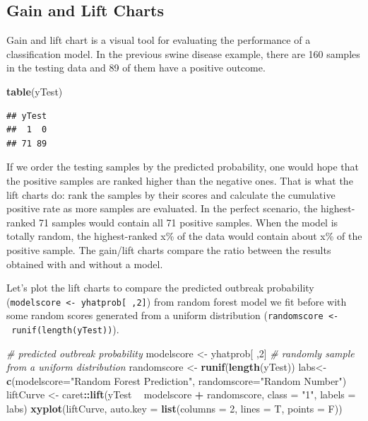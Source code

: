 \documentclass[12pt,]{krantz}
\makeatletter
\newenvironment{Shaded}{\begin{snugshade}}{\end{snugshade}}
\newcommand{\CommentTok}[1]{\textcolor[rgb]{0.37,0.37,0.37}{\textit{#1}}}
\newcommand{\DataTypeTok}[1]{\textcolor[rgb]{0.27,0.27,0.27}{#1}}
\newcommand{\DecValTok}[1]{\textcolor[rgb]{0.06,0.06,0.06}{#1}}
\newcommand{\KeywordTok}[1]{\textcolor[rgb]{0.27,0.27,0.27}{\textbf{#1}}}
\newcommand{\NormalTok}[1]{#1}
\newcommand{\OperatorTok}[1]{\textcolor[rgb]{0.43,0.43,0.43}{\textbf{#1}}}
\newcommand{\StringTok}[1]{\textcolor[rgb]{0.5,0.5,0.5}{#1}}
\newenvironment{kframe}{%
\medskip{}
\setlength{\fboxsep}{.8em}
 \def\at@end@of@kframe{}%
 \ifinner\ifhmode%
  \def\at@end@of@kframe{\end{minipage}}%
  \begin{minipage}{\columnwidth}%
 \fi\fi%
 \def\FrameCommand##1{\hskip\@totalleftmargin \hskip-\fboxsep
 \colorbox{shadecolor}{##1}\hskip-\fboxsep
     \hskip-\linewidth \hskip-\@totalleftmargin \hskip\columnwidth}%
 \MakeFramed {\advance\hsize-\width
   \@totalleftmargin\z@ \linewidth\hsize
   \@setminipage}}%
 {\par\unskip\endMakeFramed%
 \at@end@of@kframe}
\renewenvironment{Shaded}{\begin{kframe}}{\end{kframe}}
\makeatother
\begin{document}
\hypertarget{gain-and-lift-charts}{%
\subsection{Gain and Lift Charts}\label{gain-and-lift-charts}}

Gain and lift chart is a visual tool for evaluating the performance of a classification model. In the previous swine disease example, there are 160 samples in the testing data and 89 of them have a positive outcome.

\begin{Shaded}
\begin{Highlighting}[]
\KeywordTok{table}\NormalTok{(yTest)}
\end{Highlighting}
\end{Shaded}

\begin{verbatim}
## yTest
##  1  0 
## 71 89
\end{verbatim}

If we order the testing samples by the predicted probability, one would hope that the positive samples are ranked higher than the negative ones. That is what the lift charts do: rank the samples by their scores and calculate the cumulative positive rate as more samples are evaluated. In the perfect scenario, the highest-ranked 71 samples would contain all 71 positive samples. When the model is totally random, the highest-ranked x\% of the data would contain about x\% of the positive sample. The gain/lift charts compare the ratio between the results obtained with and without a model.

Let's plot the lift charts to compare the predicted outbreak probability (\texttt{modelscore\ \textless{}-\ yhatprob{[}\ ,2{]}}) from random forest model we fit before with some random scores generated from a uniform distribution (\texttt{randomscore\ \textless{}-\ runif(length(yTest))}).

\begin{Shaded}
\begin{Highlighting}[]
\CommentTok{# predicted outbreak probability}
\NormalTok{modelscore <-}\StringTok{ }\NormalTok{yhatprob[ ,}\DecValTok{2}\NormalTok{]}
\CommentTok{# randomly sample from a uniform distribution}
\NormalTok{randomscore <-}\StringTok{ }\KeywordTok{runif}\NormalTok{(}\KeywordTok{length}\NormalTok{(yTest))}
\NormalTok{labs<-}\KeywordTok{c}\NormalTok{(}\DataTypeTok{modelscore=}\StringTok{"Random Forest Prediction"}\NormalTok{,}
        \DataTypeTok{randomscore=}\StringTok{"Random Number"}\NormalTok{)}
\NormalTok{liftCurve <-}\StringTok{ }\NormalTok{caret}\OperatorTok{::}\KeywordTok{lift}\NormalTok{(yTest }\OperatorTok{~}\StringTok{ }\NormalTok{modelscore }\OperatorTok{+}\StringTok{ }\NormalTok{randomscore,}
                  \DataTypeTok{class =} \StringTok{"1"}\NormalTok{, }
                  \DataTypeTok{labels =}\NormalTok{ labs)}
\KeywordTok{xyplot}\NormalTok{(liftCurve, }\DataTypeTok{auto.key =} \KeywordTok{list}\NormalTok{(}\DataTypeTok{columns =} \DecValTok{2}\NormalTok{, }\DataTypeTok{lines =}\NormalTok{ T, }\DataTypeTok{points =}\NormalTok{ F))}
\end{Highlighting}
\end{Shaded}
\end{document}
